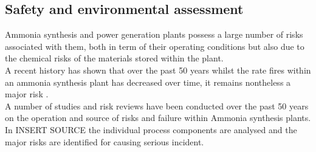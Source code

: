 {\subsection{Safety and environmental assessment}

Ammonia synthesis and power generation plants possess a large number of risks associated with them, both in term of their operating conditions but also due to the chemical risks of the materials stored within the plant. 
\\
A recent history has shown that over the past 50 years whilst the rate fires within an ammonia synthesis plant has decreased over time, it remains nontheless a major risk \cite{Ojha2010}\cite{Williams1999}.
\\
A number of studies and risk reviews have been conducted over the past 50 years on the operation and source of risks and failure within Ammonia synthesis plants. In INSERT SOURCE the individual process components are analysed and the major risks are identified for causing serious incident.
\\
}
